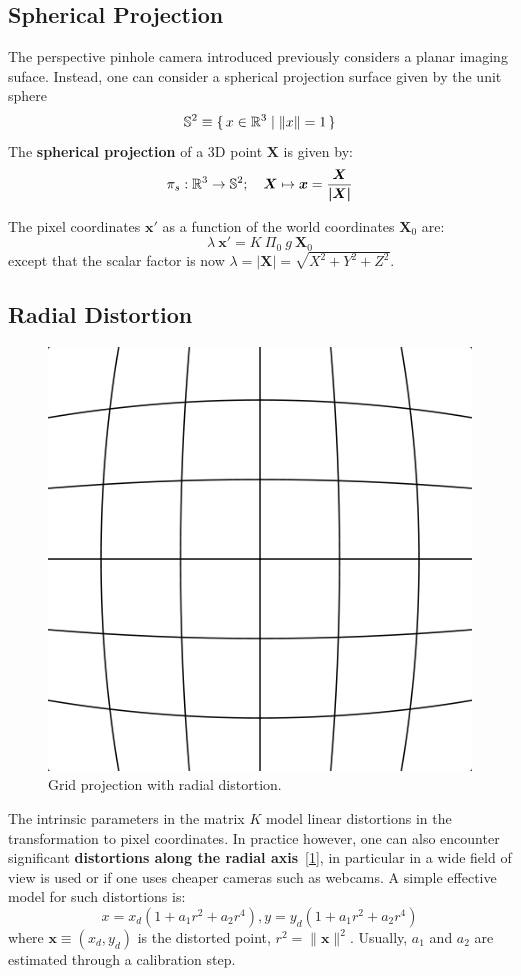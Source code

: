 \subsection{Spherical Projection}%
\label{sub:spherical_projection}


The perspective pinhole camera introduced previously considers a planar
imaging suface. Instead, one can consider a spherical projection surface
given by the unit sphere
\[\mathbb{S}^2 \equiv \{\, x \in \mathbb{R}^3 \mid{} \|x\| = 1 \,\}\]
The \textbf{spherical projection} of a 3D point $\bm{X}$ is given by:
\[\pi_s : \mathbb{R}^3 \rightarrow \mathbb{S}^2;\quad
	\bm{X} \mapsto \bm{x} = \frac{\bm{X}}{\bm{|X|}}\]

The pixel coordinates $\bm{x}'$ as a function of the world coordinates
$\bm{X}_0$ are:
\[
	\lambda\ \bm{x}' = K\ \Pi_0\ g\ \bm{X}_0
\]
except that the scalar factor is now $\lambda = |\bm{X}|
= \sqrt{ X^2 + Y^2 + Z^2 }$.


\subsection{Radial Distortion}%
\label{sub:radial_distortion}


\begin{figure}[h]
\centering
\includegraphics[width=0.5\columnwidth]{assets/img/barrel_distortion.png}
\caption{Grid projection with radial distortion.}%
\label{fig:radial_distortion}
\end{figure}

The intrinsic parameters in the matrix $K$ model linear distortions
in the transformation to pixel coordinates.
In practice however, one can also encounter significant
\textbf{distortions along the radial axis}~[\ref{fig:radial_distortion}],
in particular in a wide field of view is used or if one uses cheaper cameras
such as webcams.
A simple effective model for such distortions is:
\[
	x = x_d ( 1 + a_1 r^2 + a_2 r^4 ),
	y = y_d ( 1 + a_1 r^2 + a_2 r^4 )
\]
where $\bm{x} \equiv (x_d, y_d)$ is the distorted point,
$r^2 = \|\bm{x}\|^2$.
Usually, $a_1$ and $a_2$ are estimated through a calibration step.\\

